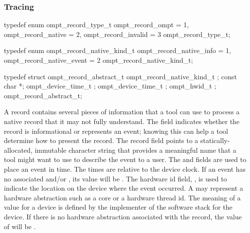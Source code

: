 \subsubsection{Tracing}
\label{sec:ompt-records}


\begin{ccppspecific}
\begin{omptEnum}
typedef enum ompt_record_type_t {
  ompt_record_ompt               = 1,
  ompt_record_native             = 2,
  ompt_record_invalid            = 3
} ompt_record_type_t;
\end{omptEnum}
\end{ccppspecific}


\label{sec:ompt_record_native_kind_t}


\begin{ccppspecific}
\begin{omptEnum}
typedef enum ompt_record_native_kind_t {
  ompt_record_native_info  = 1,
  ompt_record_native_event = 2
} ompt_record_native_kind_t;
\end{omptEnum}
\end{ccppspecific}


\label{sec:ompt_record_abstract_t}


\begin{ccppspecific}
\begin{omptRecord}
typedef struct ompt_record_abstract_t {
  ompt_record_native_kind_t ;
  const char *;
  ompt_device_time_t ;
  ompt_device_time_t ;
  ompt_hwid_t ;
} ompt_record_abstract_t;
\end{omptRecord}
\end{ccppspecific}


\descr

A  record contains several
pieces of information that a tool can use to process a native record
that it may not fully understand. The  field
indicates whether the record is informational
or represents an event; knowing this can help a tool determine
how to present the record. The record  field points to
a statically-allocated, immutable character string that provides
a meaningful name that a tool might want to use to describe the event
to a user. The  and  fields are
used to place an event in time. The times are relative to the device
clock. If an event has no associated  and/or
, its value will be
. The hardware id field,
,  is used to indicate the location on the device where
the event occurred. A  may represent a hardware abstraction
such as a core or a hardware thread id. The meaning of a 
value for a device is defined by the implementer of the software
stack for the device. If there is no hardware abstraction associated
with the record, the value of 
will be .

